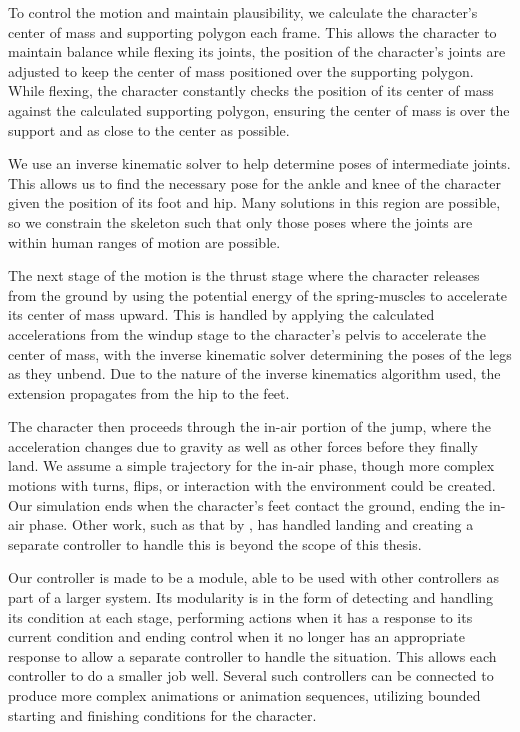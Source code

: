 To control the motion and maintain plausibility, we calculate the character's center of mass and supporting polygon each frame.  This allows the character to maintain balance while flexing its joints, the position of the character's joints are adjusted to keep the center of mass positioned over the supporting polygon.  While flexing, the character constantly checks the position of its center of mass against the calculated supporting polygon, ensuring the center of mass is over the support and as close to the center as possible.

We use an inverse kinematic solver to help determine poses of intermediate joints.  This allows us to find the necessary pose for the ankle and knee of the character given the position of its foot and hip.  Many solutions in this region are possible, so we constrain the skeleton such that only those poses where the joints are within human ranges of motion are possible.

The next stage of the motion is the thrust stage where the character releases from the ground by using the potential energy of the spring-muscles to accelerate its center of mass upward.  This is handled by applying the calculated accelerations from the windup stage to the character's pelvis to accelerate the center of mass, with the inverse kinematic solver determining the poses of the legs as they unbend.  Due to the nature of the inverse kinematics algorithm used, the extension propagates from the hip to the feet.  

The character then proceeds through the in-air portion of the jump, where the acceleration changes due to gravity as well as other forces before they finally land.  We assume a simple trajectory for the in-air phase, though more complex motions with turns, flips, or interaction with the environment could be created.  Our simulation ends when the character's feet contact the ground, ending the in-air phase.  Other work, such as that by \liufall, has handled landing and creating a separate controller to handle this is beyond the scope of this thesis. \cite{falling_landing}

Our controller is made to be a module, able to be used with other controllers as part of a larger system.  Its modularity is in the form of detecting and handling its condition at each stage, performing actions when it has a response to its current condition and ending control when it no longer has an appropriate response to allow a separate controller to handle the situation.  This allows each controller to do a smaller job well. Several such controllers can be connected to produce more complex animations or animation sequences, utilizing bounded starting and finishing conditions for the character.

